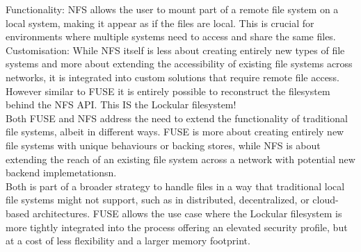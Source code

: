 \documentclass{tufte-handout}
\begin{document}
\vspace{10pt}
Functionality: NFS allows the user to mount part of a remote file system on a local system, making it appear as if the files are local.
This is crucial for environments where multiple systems need to access and share the same files.\\
\vspace{10pt}
Customisation: While NFS itself is less about creating entirely new types of file systems and more about extending the accessibility of
existing file systems across networks, it is integrated into custom solutions that require remote file access. However similar to FUSE it is
entirely possible to reconstruct the filesystem behind the NFS API. This IS the Lockular filesystem!\\
\vspace{10pt}
Both FUSE and NFS address the need to extend the functionality of traditional file systems, albeit in different ways. FUSE is more about
creating entirely new file systems with unique behaviours or backing stores, while NFS is about extending the reach of an existing file
system across a network with potential new backend implemetationsn.\\
\vspace{10pt}
Both is part of a broader strategy to handle files in a way that traditional local file systems might not
support, such as in distributed, decentralized, or cloud-based architectures. FUSE allows the use case where the Lockular filesystem is more tightly
integrated into the process offering an elevated security profile, but at a cost of less flexibility and a larger memory footprint.
\end{document}
